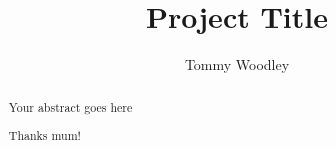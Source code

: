 \documentclass[a4paper, twoside]{report}
\title{Project Title}
\author{Tommy Woodley}
\begin{document}


\begin{abstract}
Your abstract goes here
\end{abstract}

\renewcommand{\abstractname}{Acknowledgements}
\begin{abstract}
Thanks mum!
\end{abstract}

\tableofcontents
\listoffigures
\listoftables










\end{document}
